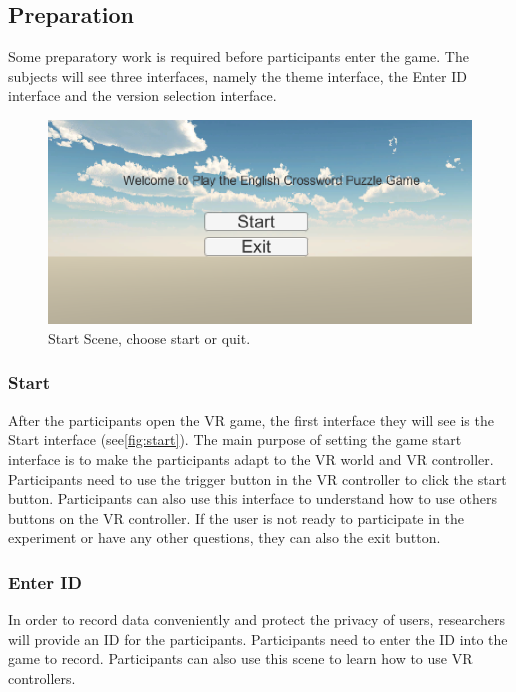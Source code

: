 \documentclass{vgtc}                          %
\begin{document}
\subsection{Preparation}
Some preparatory work is required before participants enter the game. The subjects will see three interfaces, namely the theme interface, the Enter ID interface and the version selection interface.
\begin{figure}[H]
 \centering %
 \includegraphics[width=\columnwidth]{pictures/startScene.png}
 \caption{Start Scene, choose start or quit.}
  \label{fig:start}
\end{figure}

\subsubsection{Start}
After the participants open the VR game, the first interface they will see is the Start interface (see\autoref{fig:start}). The main purpose of setting the game start interface is to make the participants adapt to the VR world and VR controller. Participants need to use the trigger button in the VR controller to click the start button. Participants can also use this interface to understand how to use others buttons on the VR controller. If the user is not ready to participate in the experiment or have any other questions, they can also  the exit button.

\subsubsection{Enter ID}
In order to record data conveniently and protect the privacy of users, researchers will provide an ID for the participants. Participants need to enter the ID into the game to record. Participants can also use this scene to learn how to use VR controllers.
\end{document}
